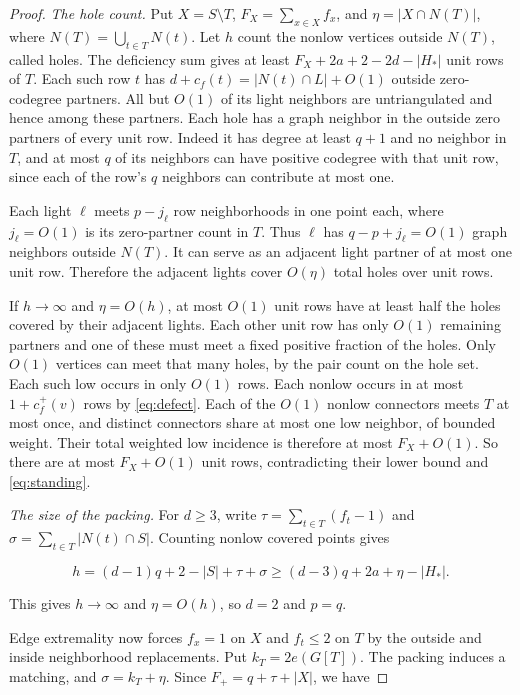 \documentclass[11pt,reqno]{amsart}
\theoremstyle{definition}
\theoremstyle{remark}
\numberwithin{equation}{section}
\begin{document}
\begin{proof}
\textit{The hole count.} Put \(X=S\setminus T\), \(F_X=\sum_{x\in X} f_x\), and \(\eta=|X\cap N(T)|\), where \(N(T)=\bigcup_{t\in T}N(t)\). Let \(h\) count the nonlow vertices outside \(N(T)\), called holes. The deficiency sum gives at least \(F_X+2a+2-2d-|H_*|\) unit rows of \(T\). Each such row \(t\) has \(d+c_f(t)=|N(t)\cap L|+O(1)\) outside zero-codegree partners. All but \(O(1)\) of its light neighbors are untriangulated and hence among these partners. Each hole has a graph neighbor in the outside zero partners of every unit row. Indeed it has degree at least \(q+1\) and no neighbor in \(T\), and at most \(q\) of its neighbors can have positive codegree with that unit row, since each of the row's \(q\) neighbors can contribute at most one.

Each light \(\ell\) meets \(p-j_\ell\) row neighborhoods in one point each, where \(j_\ell=O(1)\) is its zero-partner count in \(T\). Thus \(\ell\) has \(q-p+j_\ell=O(1)\) graph neighbors outside \(N(T)\). It can serve as an adjacent light partner of at most one unit row. Therefore the adjacent lights cover \(O(\eta)\) total holes over unit rows.

If \(h\to\infty\) and \(\eta=O(h)\), at most \(O(1)\) unit rows have at least half the holes covered by their adjacent lights. Each other unit row has only \(O(1)\) remaining partners and one of these must meet a fixed positive fraction of the holes. Only \(O(1)\) vertices can meet that many holes, by the pair count on the hole set. Each such low occurs in only \(O(1)\) rows. Each nonlow occurs in at most \(1+c_f^+(v)\) rows by \eqref{eq:defect}. Each of the \(O(1)\) nonlow connectors meets \(T\) at most once, and distinct connectors share at most one low neighbor, of bounded weight. Their total weighted low incidence is therefore at most \(F_X+O(1)\). So there are at most \(F_X+O(1)\) unit rows, contradicting their lower bound and \eqref{eq:standing}.

\textit{The size of the packing.} For \(d\ge3\), write \(\tau=\sum_{t\in T}(f_t-1)\) and \(\sigma=\sum_{t\in T}|N(t)\cap S|\). Counting nonlow covered points gives

\[
h=(d-1)q+2-|S|+\tau+\sigma
\ge(d-3)q+2a+\eta-|H_*|.
\]

This gives \(h\to\infty\) and \(\eta=O(h)\), so \(d=2\) and \(p=q\).

Edge extremality now forces \(f_x=1\) on \(X\) and \(f_t\le2\) on \(T\) by the outside and inside neighborhood replacements. Put \(k_T=2e(G[T])\). The packing induces a matching, and \(\sigma=k_T+\eta\). Since \(F_+=q+\tau+|X|\), we have


\end{proof}
\end{document}
